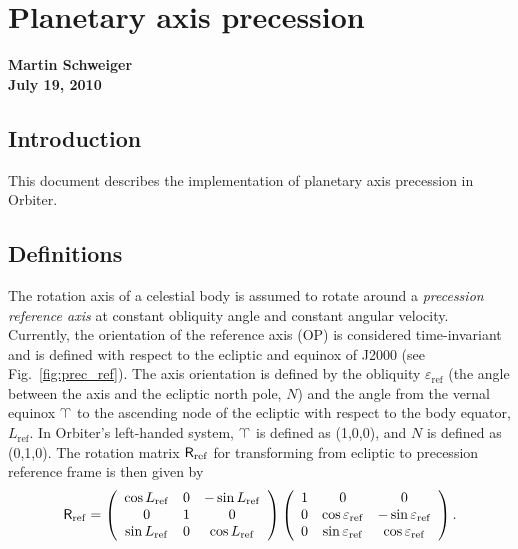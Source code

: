 \documentclass[Orbiter Technical Reference.tex]{subfiles}
\begin{document}
\section{Planetary axis precession}
\textbf{Martin Schweiger}\\
\textbf{July 19, 2010}


\subsection{Introduction}
This document describes the implementation of planetary axis precession in Orbiter.

\subsection{Definitions}
The rotation axis of a celestial body is assumed to rotate around a \emph{precession reference axis} at constant obliquity angle and constant angular velocity. Currently, the orientation of the reference axis (OP) is considered time-invariant and is defined with respect to the ecliptic and equinox of J2000 (see Fig.~\ref{fig:prec_ref}). The axis orientation is defined by the obliquity $\varepsilon_\mathrm{ref}$ (the angle between the axis and the ecliptic north pole, $N$) and the angle from the vernal equinox  $\vernal$ to the ascending node of the ecliptic with respect to the body equator, $L_\mathrm{ref}$.
In Orbiter's left-handed system, $\vernal$ is defined as (1,0,0), and $N$ is defined as (0,1,0). The rotation matrix $\mathsf{R}_\mathrm{ref}$ for transforming from ecliptic to precession reference frame is then given by
\begin{equation}
\mathsf{R}_\mathrm{ref} = \left( \begin{array}{ccc}
\cos L_\mathrm{ref} & 0 & -\sin L_\mathrm{ref} \\
0 & 1 & 0 \\
\sin L_\mathrm{ref} & 0 & \cos L_\mathrm{ref} \end{array} \right)
\left( \begin{array}{ccc}
1 & 0 & 0 \\
0 & \cos\varepsilon_\mathrm{ref} & -\sin\varepsilon_\mathrm{ref} \\
0  & \sin\varepsilon_\mathrm{ref} & \cos\varepsilon_\mathrm{ref}
\end{array} \right).
\end{equation}
\end{document}
